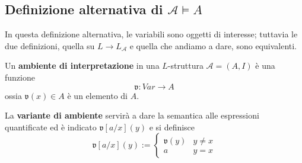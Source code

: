 \subsection{Definizione alternativa di $\mathcal{A} \models A$} 
In questa definizione alternativa,  le variabili sono oggetti di interesse; 
tuttavia le due definizioni, quella su $L\rightarrow L_{\mathcal{A}}$ e quella
che andiamo a dare, sono equivalenti. 
\begin{defi}[Ambiente]
        Un \textbf{ambiente di interpretazione} in una $L$-struttura $\mathcal{A} = (A,I)$ è 
        una funzione 
        $$
        \mathfrak{v} : Var \rightarrow A
        $$
        ossia $\mathfrak{v}(x) \in A$ è un elemento di $A$.         
\end{defi}
\begin{defi}
        La \textbf{variante di ambiente} servirà a dare la semantica alle espressioni 
        quantificate ed è indicato $\mathfrak{v}[a/x](y)$ e si definisce 
        $$
        \mathfrak{v}[a/x](y) :=
        \begin{cases}
                \mathfrak{v}(y) & y \neq x \\
                a & y = x
        \end{cases}
        $$
\end{defi}
